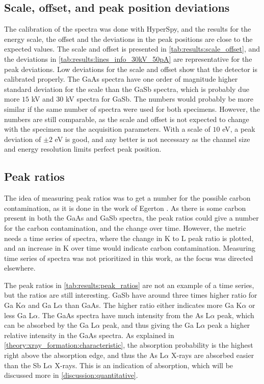 \subsection{Scale, offset, and peak position deviations}
\label{discussion:scale_offset}

The calibration of the spectra was done with HyperSpy, and the results for the energy scale, the offset and the deviations in the peak positions are close to the expected values.
The scale and offset is presented in \cref{tab:results:scale_offset}, and the deviations in \cref{tab:results:lines_info_30kV_50pA} are representative for the peak deviations.
Low deviations for the scale and offset show that the detector is calibrated properly.
The GaAs spectra have one order of magnitude higher standard deviation for the scale than the GaSb spectra, which is probably due more $15$ kV and $30$ kV spectra for GaSb.
The numbers would probably be more similar if the same number of spectra were used for both specimens.
However, the numbers are still comparable, as the scale and offset is not expected to change with the specimen nor the acquisition parameters.
With a scale of $10$ eV, a peak deviation of $\pm 2$ eV is good, and any better is not necessary as the channel size and energy resolution limits perfect peak position.




\subsection{Peak ratios}
\label{discussion:peak_ratios}

The idea of measuring peak ratios was to get a number for the possible carbon contamination, as it is done in the work of Egerton \cite{egerton_nio_characterization_1994}.
As there is some carbon present in both the GaAs and GaSb spectra, the peak ratios could give a number for the carbon contamination, and the change over time.
However, the metric needs a time series of spectra, where the change in K to L peak ratio is plotted, and an increase in K over time would indicate carbon contamination.
Measuring time series of spectra was not prioritized in this work, as the focus was directed elsewhere.

The peak ratios in \cref{tab:results:peak_ratios} are not an example of a time series, but the ratios are still interesting.
GaSb have around three times higher ratio for Ga K$\alpha$ and Ga L$\alpha$ than GaAs.
The higher ratio either indicates more Ga K$\alpha$ or less Ga L$\alpha$.
The GaAs spectra have much intensity from the As L$\alpha$ peak, which can be absorbed by the Ga L$\alpha$ peak, and thus giving the Ga L$\alpha$ peak a higher relative intensity in the GaAs spectra.
As explained in \cref{theory:xray_formation:characteristic}, the absorption probability is the highest right above the absorption edge, and thus the As L$\alpha$ X-rays are absorbed easier than the Sb L$\alpha$ X-rays.
This is an indication of absorption, which will be discussed more in \cref{discussion:quantitative}.



